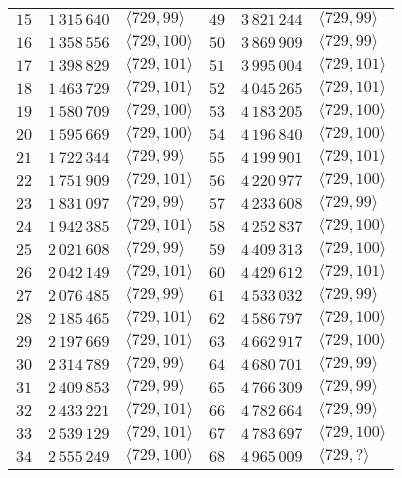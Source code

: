\documentclass{amsart}
\theoremstyle{definition}
\numberwithin{equation}{section}
\begin{document}
\begin{table}[ht]
\begin{center}
\begin{tabular}{|r|r|l||r|r|l|}
 \(15\) & \(1\,315\,640\) & \(\langle 729,99\rangle\)  & \(49\) & \(3\,821\,244\) & \(\langle 729,99\rangle\)  \\
 \(16\) & \(1\,358\,556\) & \(\langle 729,100\rangle\) & \(50\) & \(3\,869\,909\) & \(\langle 729,99\rangle\)  \\
 \(17\) & \(1\,398\,829\) & \(\langle 729,101\rangle\) & \(51\) & \(3\,995\,004\) & \(\langle 729,101\rangle\) \\
 \(18\) & \(1\,463\,729\) & \(\langle 729,101\rangle\) & \(52\) & \(4\,045\,265\) & \(\langle 729,101\rangle\) \\
 \(19\) & \(1\,580\,709\) & \(\langle 729,100\rangle\) & \(53\) & \(4\,183\,205\) & \(\langle 729,100\rangle\) \\
 \(20\) & \(1\,595\,669\) & \(\langle 729,100\rangle\) & \(54\) & \(4\,196\,840\) & \(\langle 729,100\rangle\) \\
 \(21\) & \(1\,722\,344\) & \(\langle 729,99\rangle\)  & \(55\) & \(4\,199\,901\) & \(\langle 729,101\rangle\) \\
 \(22\) & \(1\,751\,909\) & \(\langle 729,101\rangle\) & \(56\) & \(4\,220\,977\) & \(\langle 729,100\rangle\) \\
 \(23\) & \(1\,831\,097\) & \(\langle 729,99\rangle\)  & \(57\) & \(4\,233\,608\) & \(\langle 729,99\rangle\)  \\
 \(24\) & \(1\,942\,385\) & \(\langle 729,101\rangle\) & \(58\) & \(4\,252\,837\) & \(\langle 729,100\rangle\) \\
 \(25\) & \(2\,021\,608\) & \(\langle 729,99\rangle\)  & \(59\) & \(4\,409\,313\) & \(\langle 729,100\rangle\) \\
 \(26\) & \(2\,042\,149\) & \(\langle 729,101\rangle\) & \(60\) & \(4\,429\,612\) & \(\langle 729,101\rangle\) \\
 \(27\) & \(2\,076\,485\) & \(\langle 729,99\rangle\)  & \(61\) & \(4\,533\,032\) & \(\langle 729,99\rangle\)  \\
 \(28\) & \(2\,185\,465\) & \(\langle 729,101\rangle\) & \(62\) & \(4\,586\,797\) & \(\langle 729,100\rangle\) \\
 \(29\) & \(2\,197\,669\) & \(\langle 729,101\rangle\) & \(63\) & \(4\,662\,917\) & \(\langle 729,100\rangle\) \\
 \(30\) & \(2\,314\,789\) & \(\langle 729,99\rangle\)  & \(64\) & \(4\,680\,701\) & \(\langle 729,99\rangle\)  \\
 \(31\) & \(2\,409\,853\) & \(\langle 729,99\rangle\)  & \(65\) & \(4\,766\,309\) & \(\langle 729,99\rangle\)  \\
 \(32\) & \(2\,433\,221\) & \(\langle 729,101\rangle\) & \(66\) & \(4\,782\,664\) & \(\langle 729,99\rangle\)  \\
 \(33\) & \(2\,539\,129\) & \(\langle 729,101\rangle\) & \(67\) & \(4\,783\,697\) & \(\langle 729,100\rangle\) \\
 \(34\) & \(2\,555\,249\) & \(\langle 729,100\rangle\) & \(68\) & \(4\,965\,009\) & \(\langle 729,?\rangle\) \\
\hline
\end{tabular}
\end{center}
\end{table}
\end{document}

